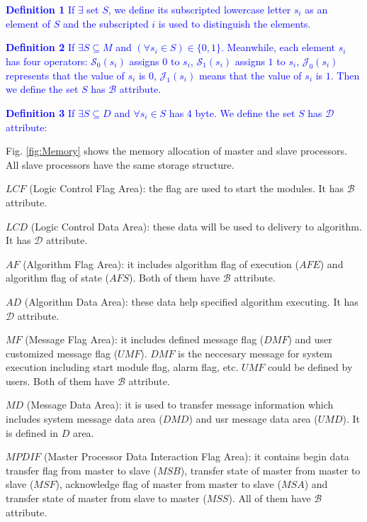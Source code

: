 \documentclass[journal,UTF8]{IEEEtran}
\begin{document}
\textcolor{blue}{\textbf{Definition 1} If $\exists$ set $S$, we define its subscripted lowercase letter $s_i$ as an element of $S$ and the subscripted $i$ is used to distinguish the elements.}

\textcolor{blue}{\textbf{Definition 2} If $\exists S \subseteq M$ and $(\forall s_{i} \in S) \in \{0, 1\} $. Meanwhile, each element $s_i$ has four operators: $\mathcal{S}_0(s_i)$ assigns $0$ to $s_i$, $\mathcal{S}_1(s_i)$ assigns $1$ to $s_i$, $\mathcal{J}_0(s_i)$ represents that the value of $s_i$ is $0$, $\mathcal{J}_1(s_i)$ means that the value of $s_i$ is $1$. Then we define the set $S$ has $\mathcal{B}$ attribute.}

\textcolor{blue}{\textbf{Definition 3} If $\exists S \subseteq D$ and $\forall s_{i} \in S$ has 4 byte. We define the set $S$ has $\mathcal{D}$ attribute:}





Fig. \ref{fig:Memory} shows the memory allocation of master and slave processors. All slave processors have the same storage structure.

\textbf{$LCF$} (Logic Control Flag Area): the flag are used to start the modules. It has $\mathcal{B}$ attribute.

\textbf{$LCD$} (Logic Control Data Area): these data will be used to delivery to algorithm. It has $\mathcal{D}$ attribute.

\textbf{$AF$} (Algorithm Flag Area): it includes algorithm flag of execution ($AFE$) and algorithm flag of state ($AFS$).
Both of them have $\mathcal{B}$ attribute.

\textbf{$AD$} (Algorithm Data Area): these data help specified algorithm executing. It has $\mathcal{D}$ attribute.

\textbf{$MF$} (Message Flag Area): it includes defined message flag ($DMF$) and user customized message flag ($UMF$). $DMF$ is the neccesary message for system execution including start module flag, alarm flag, etc. $UMF$ could be defined by users. Both of them have $\mathcal{B}$ attribute.

\textbf{$MD$} (Message Data Area): it is used to transfer message information which includes system message data area ($DMD$) and usr message data area ($UMD$). It is defined in $D$ area.

\textbf{$MPDIF$} (Master Processor Data Interaction Flag Area): it contains begin data transfer flag from master to slave ($MSB$), transfer state of master from master to slave ($MSF$), acknowledge flag of master from master to slave ($MSA$) and transfer state of master from slave to master ($MSS$). All of them have $\mathcal{B}$ attribute.
\end{document}
